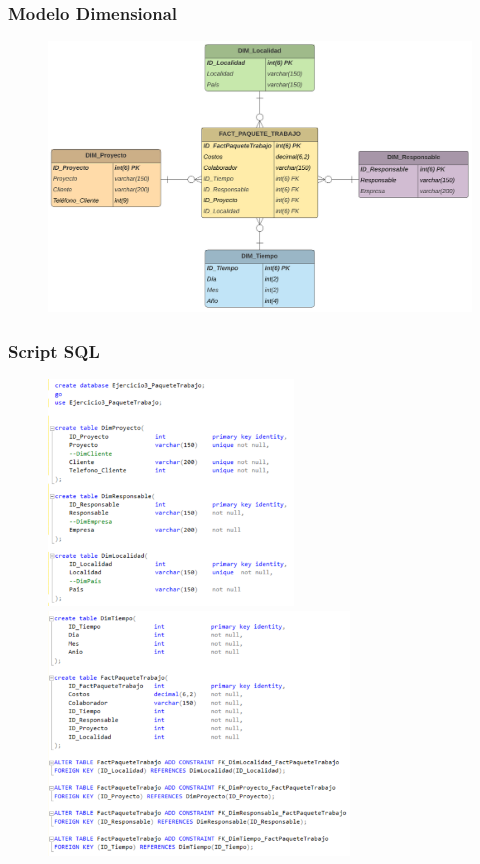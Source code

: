 \documentclass{article}
\begin{document}
\subsubsection{\textbf{Modelo Dimensional }}

	\begin{figure}[htb]
		\begin{center}
			\includegraphics[width=14cm]{./images/mod_dimensional_3}
			
		\end{center}
	\end{figure}

\subsubsection{\textbf{Script SQL }}

	\begin{figure}[htb]
		\begin{center}
			\includegraphics[width=6.5cm]{./images/Ejercicio3_script1}
			\includegraphics[width=8cm]{./images/Ejercicio3_script2}
		\end{center}
	\end{figure}
\newpage
\end{document}
